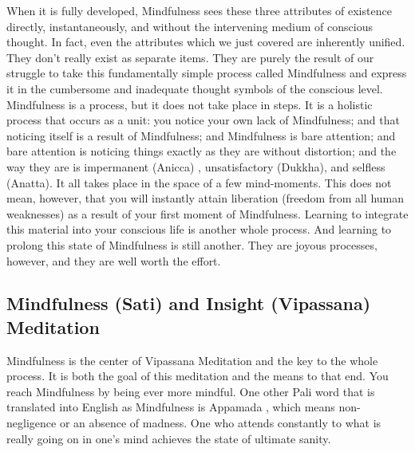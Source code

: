 When it is fully developed, Mindfulness sees these three attributes of existence
directly, instantaneously, and without the intervening medium of conscious
thought. In fact, even the attributes which we just covered are inherently
unified. They don't really exist as separate items. They are purely the result
of our struggle to take this fundamentally simple process called Mindfulness and
express it in the cumbersome and inadequate thought symbols of the conscious
level. Mindfulness is a process, but it does not take place in steps. It is a
holistic process that occurs as a unit: you notice your own lack of Mindfulness;
and that noticing itself is a result of Mindfulness; and Mindfulness is bare
attention; and bare attention is noticing things exactly as they are without
distortion; and the way they are is impermanent (Anicca) , unsatisfactory
(Dukkha), and selfless (Anatta). It all takes place in the space of a few
mind-moments. This does not mean, however, that you will instantly attain
liberation (freedom from all human weaknesses) as a result of your first moment
of Mindfulness. Learning to integrate this material into your conscious life is
another whole process. And learning to prolong this state of Mindfulness is
still another. They are joyous processes, however, and they are well worth the
effort.

\subsection{Mindfulness (Sati) and Insight (Vipassana) Meditation}
Mindfulness is the center
of Vipassana Meditation and the key to the whole process. It is both the goal of
this meditation and the means to that end. You reach Mindfulness by being ever
more mindful. One other Pali word that is translated into English as Mindfulness
is Appamada , which means non-negligence or an absence of madness. One who
attends constantly to what is really going on in one's mind achieves the state
of ultimate sanity.

